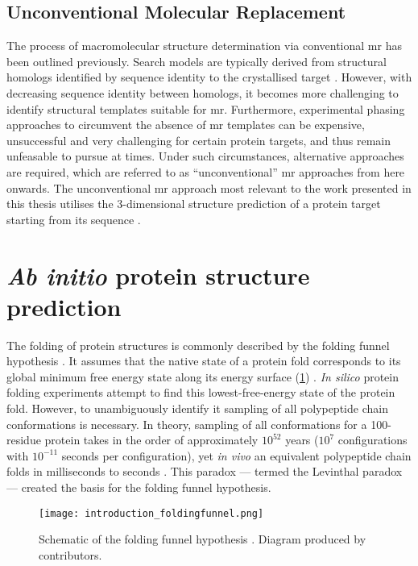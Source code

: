\subsection{Unconventional Molecular Replacement}
The process of macromolecular structure determination via conventional \gls{mr} has been outlined previously. Search models are typically derived from structural homologs identified by sequence identity to the crystallised target \cite{Rupp2010-nc}. However, with decreasing sequence identity between homologs, it becomes more challenging to identify structural templates suitable for \gls{mr}. Furthermore, experimental phasing approaches to circumvent the absence of \gls{mr} templates can be expensive, unsuccessful and very challenging for certain protein targets, and thus remain unfeasable to pursue at times. Under such circumstances, alternative approaches are required, which are referred to as ``unconventional'' \gls{mr} approaches from here onwards. The unconventional \gls{mr} approach most relevant to the work presented in this thesis utilises the 3-dimensional structure prediction of a protein target starting from its sequence \cite{Qian2007-vo,Rigden2008-vo,Das2009-uz}. 
 
%
%

\section{\textit{Ab initio} protein structure prediction} \label{sec:introduction_structure_prediction}
The folding of protein structures is commonly described by the folding funnel hypothesis \cite{Leopold1992-yf}. It assumes that the native state of a protein fold corresponds to its global minimum free energy state along its energy surface (\cref{fig:introduction_foldingfunnel}) \cite{Anfinsen1973-in}. \textit{In silico} protein folding experiments attempt to find this lowest-free-energy state of the protein fold. However, to unambiguously identify it sampling of all polypeptide chain conformations is necessary. In theory, sampling of all conformations for a 100-residue protein takes in the order of approximately $10^{52}$ years ($10^7$ configurations with $10^{-11}$ seconds per configuration), yet \textit{in vivo} an equivalent polypeptide chain folds in milliseconds to seconds \cite{Levinthal1969-bn,Karplus2011-jh}. This paradox --- termed the Levinthal paradox \cite{Levinthal1969-bn} --- created the basis for the folding funnel hypothesis.  

\begin{figure}[H]
    \centering
    \texttt{[image: introduction\_foldingfunnel.png]}
    \caption[Schematic of the folding funnel hypothesis.]{Schematic of the folding funnel hypothesis \cite{Leopold1992-yf}. Diagram produced by \textcite{Wikipedia-FoldingFunnel} contributors.}
    \label{fig:introduction_foldingfunnel}
\end{figure}

